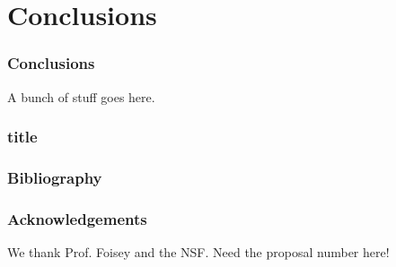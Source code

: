 \section{Conclusions}

\begin{frame}
  \frametitle{Conclusions}

  A bunch of stuff goes here.

\end{frame}

\begin{frame}
  \frametitle{title}
  
\end{frame}

\begin{frame}
  \frametitle{Bibliography}
  
\end{frame}

\begin{frame}
  \frametitle{Acknowledgements}

  We thank Prof. Foisey and the NSF. Need the proposal number here!

\end{frame}


